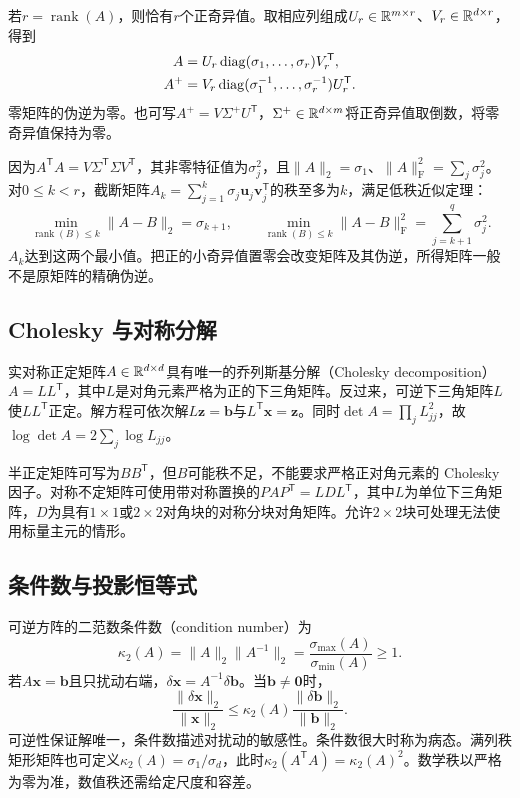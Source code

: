 若$r=\operatorname{rank}(A)$，则恰有$r$个正奇异值。取相应列组成$U_r\in\mathbb{R}^{m\times r}$、$V_r\in\mathbb{R}^{d\times r}$，得到
\begin{align}
 A&=U_r\operatorname{diag}(\sigma_1,\ldots,\sigma_r)V_r^{\mathsf T},\\
 A^+&=V_r\operatorname{diag}(\sigma_1^{-1},\ldots,\sigma_r^{-1})U_r^{\mathsf T}.
\end{align}
零矩阵的伪逆为零。也可写$A^+=V\Sigma^+U^{\mathsf T}$，$\Sigma^+\in\mathbb{R}^{d\times m}$将正奇异值取倒数，将零奇异值保持为零。

因为$A^{\mathsf T}A=V\Sigma^{\mathsf T}\Sigma V^{\mathsf T}$，其非零特征值为$\sigma_j^2$，且$\|A\|_2=\sigma_1$、$\|A\|_{\mathrm F}^2=\sum_j\sigma_j^2$。对$0\leq k<r$，截断矩阵$A_k=\sum_{j=1}^k\sigma_j\bm u_j\bm v_j^{\mathsf T}$的秩至多为$k$，满足低秩近似定理：
\begin{equation}
 \min_{\operatorname{rank}(B)\leq k}\|A-B\|_2=\sigma_{k+1},\qquad
 \min_{\operatorname{rank}(B)\leq k}\|A-B\|_{\mathrm F}^2=\sum_{j=k+1}^q\sigma_j^2.
\end{equation}
$A_k$达到这两个最小值。把正的小奇异值置零会改变矩阵及其伪逆，所得矩阵一般不是原矩阵的精确伪逆。

\subsection{Cholesky 与对称分解}
实对称正定矩阵$A\in\mathbb{R}^{d\times d}$具有唯一的乔列斯基分解（Cholesky decomposition）$A=LL^{\mathsf T}$，其中$L$是对角元素严格为正的下三角矩阵。反过来，可逆下三角矩阵$L$使$LL^{\mathsf T}$正定。解方程可依次解$L\bm z=\bm b$与$L^{\mathsf T}\bm x=\bm z$。同时$\det A=\prod_jL_{jj}^2$，故$\log\det A=2\sum_j\log L_{jj}$。

半正定矩阵可写为$BB^{\mathsf T}$，但$B$可能秩不足，不能要求严格正对角元素的 Cholesky 因子。对称不定矩阵可使用带对称置换的$PAP^{\mathsf T}=LDL^{\mathsf T}$，其中$L$为单位下三角矩阵，$D$为具有$1\times1$或$2\times2$对角块的对称分块对角矩阵。允许$2\times2$块可处理无法使用标量主元的情形。

\subsection{条件数与投影恒等式}
可逆方阵的二范数条件数（condition number）为
\begin{equation}
 \kappa_2(A)=\|A\|_2\|A^{-1}\|_2=\frac{\sigma_{\max}(A)}{\sigma_{\min}(A)}\geq1.
\end{equation}
若$A\bm x=\bm b$且只扰动右端，$\delta\bm x=A^{-1}\delta\bm b$。当$\bm b\ne\bm0$时，
\begin{equation}
 \frac{\|\delta\bm x\|_2}{\|\bm x\|_2}
 \leq\kappa_2(A)\frac{\|\delta\bm b\|_2}{\|\bm b\|_2}.
\end{equation}
可逆性保证解唯一，条件数描述对扰动的敏感性。条件数很大时称为病态。满列秩矩形矩阵也可定义$\kappa_2(A)=\sigma_1/\sigma_d$，此时$\kappa_2(A^{\mathsf T}A)=\kappa_2(A)^2$。数学秩以严格为零为准，数值秩还需给定尺度和容差。

